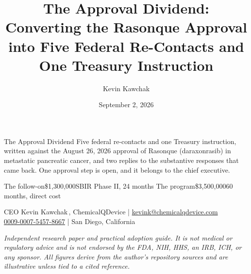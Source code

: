 \documentclass[11pt]{article}
\title{The Approval Dividend: Converting the Rasonque Approval into Five Federal
Re-Contacts and One Treasury Instruction}
\author{Kevin Kawchak}
\date{September 2, 2026}
\begin{document}
\thispagestyle{plain}

%
{The Approval Dividend}%
{Five federal re-contacts and one Treasury instruction, written against the
August 26, 2026 approval of Rasonque (daraxonrasib) in metastatic pancreatic
cancer, and two replies to the substantive responses that came back. One
approval step is open, and it belongs to the chief executive.}

\vspace{0.15em}

\begin{center}
 \enspace {} \enspace
{} \enspace {} \enspace
{}
\end{center}

\vspace{-0.15em}

%
{The follow-on}{\$1,300,000}{SBIR Phase II, 24 months}%
{The program}{\$3,500,000}{60 months, direct cost}

\vspace{-0.1em}
\apprule{0.9pt}

\begin{center}\small
CEO Kevin Kawchak\,, ChemicalQDevice \;|\;
\href{mailto:kevink@chemicalqdevice.com}{kevink@chemicalqdevice.com}\\
\href{https://orcid.org/0009-0007-5457-8667}{0009-0007-5457-8667} \;|\;
San Diego, California
\end{center}

\vspace{-0.25em}
\apprule{0.5pt}

\noindent\footnotesize\textit{Independent research paper and practical adoption
guide. It is not medical or regulatory advice and is not endorsed by the FDA,
NIH, HHS, an IRB, ICH, or any sponsor. All figures derive from the author's
repository sources and are illustrative unless tied to a cited
reference.}\normalsize\par
\end{document}
